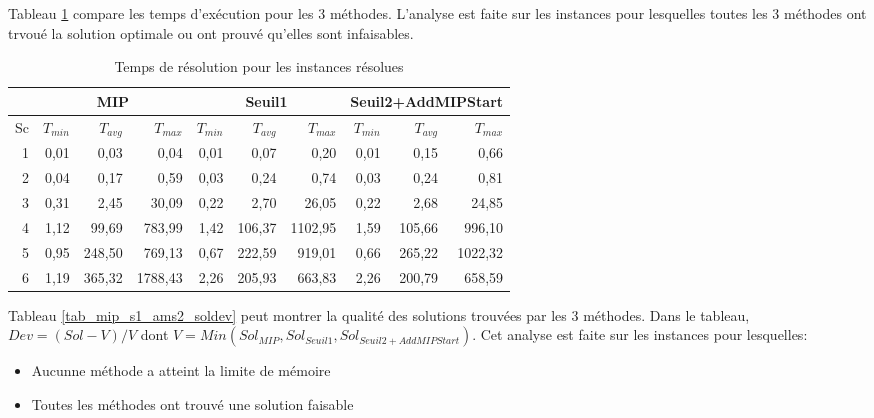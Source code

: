 \documentclass[twoside,fleqn]{EPURapport}
\begin{document}
Tableau \ref{tab_mip_s1_ams2_temps} compare les temps d'exécution pour les 3 méthodes. L'analyse est faite sur les instances pour lesquelles toutes les 3 méthodes ont trvoué la solution optimale ou ont prouvé qu'elles sont infaisables.
\begin{table}[h]
    \centering
    \begin{tabular}{|r|r|r|r|r|r|r|r|r|r|}
    	\hline
    &	\multicolumn{3}{c|}{MIP} &\multicolumn{3}{c|}{Seuil1} & \multicolumn{3}{c|}{Seuil2+AddMIPStart}	\\ \hline
Sc & $T_{min}$ & $T_{avg}$	& $T_{max}$ & $T_{min}$ & $T_{avg}$	& $T_{max}$ & $T_{min}$ & $T_{avg}$	& $T_{max}$  \\ \hline
1&	0,01	&0,03	&0,04	    &0,01	&0,07	&0,20	&0,01	&0,15	&0,66        \\ \hline
2&	0,04	&0,17	&0,59	    &0,03	&0,24	&0,74	&0,03	&0,24	&0,81        \\ \hline
3&	0,31	&2,45	&30,09	    &0,22	&2,70	&26,05	&0,22	&2,68	&24,85      	\\ \hline
4&	1,12	&99,69	&783,99	    &1,42	&106,37	&1102,95	&1,59	&105,66	&996,10      	\\ \hline
5&	0,95	&248,50	&769,13	    &0,67	&222,59	&919,01	&0,66	&265,22	&1022,32        \\ \hline
6&	1,19	&365,32	&1788,43	&2,26	&205,93	&663,83	&2,26	&200,79	&658,59      	\\ \hline
    \end{tabular}
    \caption{Temps de résolution pour les instances résolues}
    \label{tab_mip_s1_ams2_temps}
\end{table}
\bigskip


Tableau \ref{tab_mip_s1_ams2_soldev} peut montrer la qualité des solutions trouvées par les 3 méthodes. Dans le tableau, $Dev = (Sol-V)/V$ dont $V =Min(Sol_{MIP},Sol_{Seuil1},Sol_{Seuil2+AddMIPStart})$. Cet analyse est faite sur les instances pour lesquelles:
\begin{itemize}
 \item Aucunne méthode a atteint la limite de mémoire
 \item Toutes les méthodes ont trouvé une solution faisable
\end{itemize}
\end{document}
